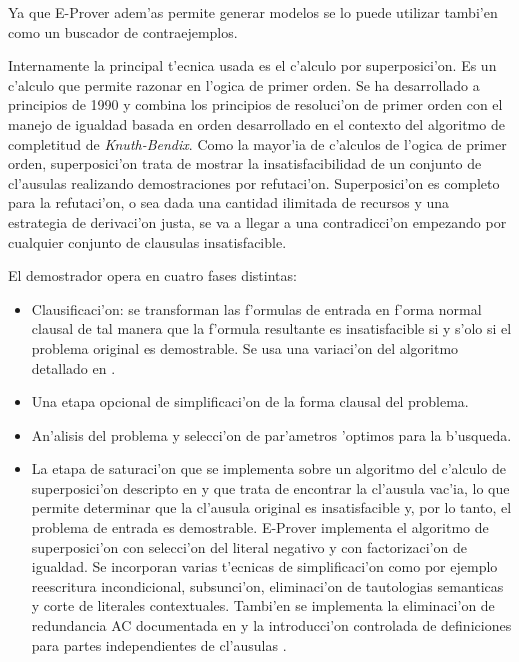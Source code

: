 Ya que E-Prover adem'as permite generar modelos se lo puede utilizar tambi'en como un buscador de contraejemplos.

Internamente la principal t'ecnica usada es el c'alculo por superposici'on. Es un c'alculo que permite razonar en l'ogica de primer orden. Se ha desarrollado a principios de 1990 y combina los principios de resoluci'on de primer orden con el manejo de igualdad basada en orden desarrollado en el contexto del algoritmo de completitud de \textit{Knuth-Bendix}\cite{knuthbendix}. Como la mayor'ia de c'alculos de l'ogica de primer orden, superposici'on trata de mostrar la insatisfacibilidad de un conjunto de cl'ausulas realizando demostraciones por refutaci'on. Superposici'on es completo para la refutaci'on, o sea dada una cantidad ilimitada de recursos y una estrategia de derivaci'on justa, se va a llegar a una contradicci'on empezando por cualquier conjunto de clausulas insatisfacible.

El demostrador opera en cuatro fases distintas:
\begin{itemize}
\item Clausificaci'on: se transforman las f'ormulas de entrada en f'orma normal clausal de tal manera que la f'ormula resultante es insatisfacible si y s'olo si el problema original es demostrable. Se usa una variaci'on del algoritmo detallado en \cite{smallcnf2001}.

\item Una etapa opcional de simplificaci'on de la forma clausal del problema.

\item An'alisis del problema y selecci'on de par'ametros 'optimos para la b'usqueda. 

\item La etapa de saturaci'on que se implementa sobre un algoritmo del c'alculo de superposici'on descripto en \cite{bg94} y \cite{aicom2002} que trata de encontrar la cl'ausula vac'ia, lo que permite determinar que la cl'ausula original es insatisfacible y, por lo tanto, el problema de entrada es demostrable. E-Prover implementa el algoritmo de superposici'on con selecci'on del literal negativo y con factorizaci'on de igualdad. Se incorporan varias t'ecnicas de simplificaci'on como por ejemplo reescritura incondicional, subsunci'on, eliminaci'on de tautologias semanticas y corte de literales contextuales. Tambi'en se implementa la eliminaci'on de redundancia AC documentada en \cite{jsc2003} y la introducci'on controlada de definiciones para partes independientes de cl'ausulas \cite{ijcai2001}.
\end{itemize}

